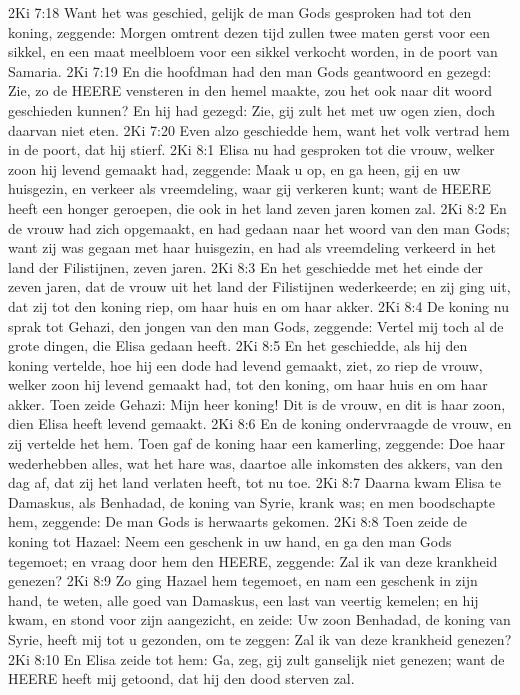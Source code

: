 2Ki 7:18  Want het was geschied, gelijk de man Gods gesproken had tot den koning, zeggende: Morgen omtrent dezen tijd zullen twee maten gerst voor een sikkel, en een maat meelbloem voor een sikkel verkocht worden, in de poort van Samaria.
2Ki 7:19  En die hoofdman had den man Gods geantwoord en gezegd: Zie, zo de HEERE vensteren in den hemel maakte, zou het ook naar dit woord geschieden kunnen? En hij had gezegd: Zie, gij zult het met uw ogen zien, doch daarvan niet eten.
2Ki 7:20  Even alzo geschiedde hem, want het volk vertrad hem in de poort, dat hij stierf.
2Ki 8:1  Elisa nu had gesproken tot die vrouw, welker zoon hij levend gemaakt had, zeggende: Maak u op, en ga heen, gij en uw huisgezin, en verkeer als vreemdeling, waar gij verkeren kunt; want de HEERE heeft een honger geroepen, die ook in het land zeven jaren komen zal.
2Ki 8:2  En de vrouw had zich opgemaakt, en had gedaan naar het woord van den man Gods; want zij was gegaan met haar huisgezin, en had als vreemdeling verkeerd in het land der Filistijnen, zeven jaren.
2Ki 8:3  En het geschiedde met het einde der zeven jaren, dat de vrouw uit het land der Filistijnen wederkeerde; en zij ging uit, dat zij tot den koning riep, om haar huis en om haar akker.
2Ki 8:4  De koning nu sprak tot Gehazi, den jongen van den man Gods, zeggende: Vertel mij toch al de grote dingen, die Elisa gedaan heeft.
2Ki 8:5  En het geschiedde, als hij den koning vertelde, hoe hij een dode had levend gemaakt, ziet, zo riep de vrouw, welker zoon hij levend gemaakt had, tot den koning, om haar huis en om haar akker. Toen zeide Gehazi: Mijn heer koning! Dit is de vrouw, en dit is haar zoon, dien Elisa heeft levend gemaakt.
2Ki 8:6  En de koning ondervraagde de vrouw, en zij vertelde het hem. Toen gaf de koning haar een kamerling, zeggende: Doe haar wederhebben alles, wat het hare was, daartoe alle inkomsten des akkers, van den dag af, dat zij het land verlaten heeft, tot nu toe.
2Ki 8:7  Daarna kwam Elisa te Damaskus, als Benhadad, de koning van Syrie, krank was; en men boodschapte hem, zeggende: De man Gods is herwaarts gekomen.
2Ki 8:8  Toen zeide de koning tot Hazael: Neem een geschenk in uw hand, en ga den man Gods tegemoet; en vraag door hem den HEERE, zeggende: Zal ik van deze krankheid genezen?
2Ki 8:9  Zo ging Hazael hem tegemoet, en nam een geschenk in zijn hand, te weten, alle goed van Damaskus, een last van veertig kemelen; en hij kwam, en stond voor zijn aangezicht, en zeide: Uw zoon Benhadad, de koning van Syrie, heeft mij tot u gezonden, om te zeggen: Zal ik van deze krankheid genezen?
2Ki 8:10  En Elisa zeide tot hem: Ga, zeg, gij zult ganselijk niet genezen; want de HEERE heeft mij getoond, dat hij den dood sterven zal.

